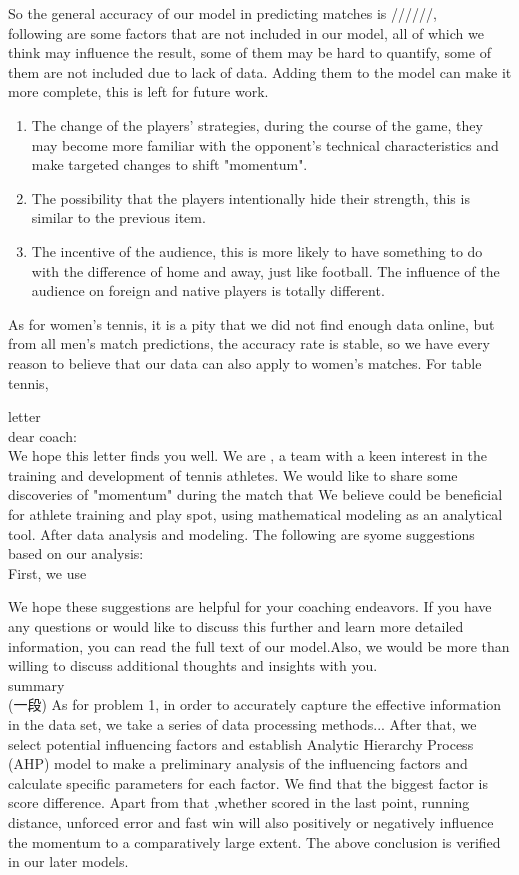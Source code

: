 \documentclass[12pt, a4paper, oneside]{article}
\theoremstyle{break}
\begin{document}
So the general accuracy of our model in predicting matches is //////, \\
following are some factors that are not included in our model, 
all of which we think may influence the result, some of them may be hard to quantify, some of them are not included due to lack
of data. Adding them to the model can make it more complete, this is left for future work.
\begin{enumerate}
    \item The change of the players' strategies, during the course of the game, they may become more 
    familiar with the opponent's technical characteristics and make targeted changes to shift "momentum".
    \item The possibility that the players intentionally hide their strength, this is similar to the previous item.
    \item The incentive of the audience, this is more likely to have something to do with the difference of home and away,
    just like football. The influence of the audience on foreign and native players is totally different.
\end{enumerate}

As for women's tennis, it is a pity that we did not find enough data online, but from all men's match predictions, the 
accuracy rate is stable, so we have every reason to believe that our data can also apply to women's matches. For table tennis,


letter\\
dear coach:\\

We hope this letter finds you well. We are , a team with a keen interest in the training and development of tennis 
athletes. We would like to share some discoveries of "momentum" during the match that We believe could be beneficial 
for athlete training and play spot, using mathematical modeling as an analytical tool. After data analysis and modeling. 
The following are syome suggestions based on our analysis:\\

First, we use


We hope these suggestions are helpful for your coaching endeavors. 
If you have any questions or would like to discuss this further and learn more detailed information, 
you can read the full text of our model.Also, we would be more
 than willing to discuss additional thoughts and insights with you.\\


summary\\
(一段)
As for problem 1,  in order to accurately capture the effective information in the data 
set, we take a series of data processing methods... After that, we select potential influencing
factors and establish Analytic Hierarchy Process (AHP) model to make a preliminary analysis of the influencing
factors and calculate specific parameters for each factor. We find that the biggest factor is 
score difference. Apart from that ,whether scored in the last point, running distance, unforced error and fast win
will also positively or negatively influence the momentum to a comparatively large extent. The above conclusion is verified
in our later models.\\
\end{document}

